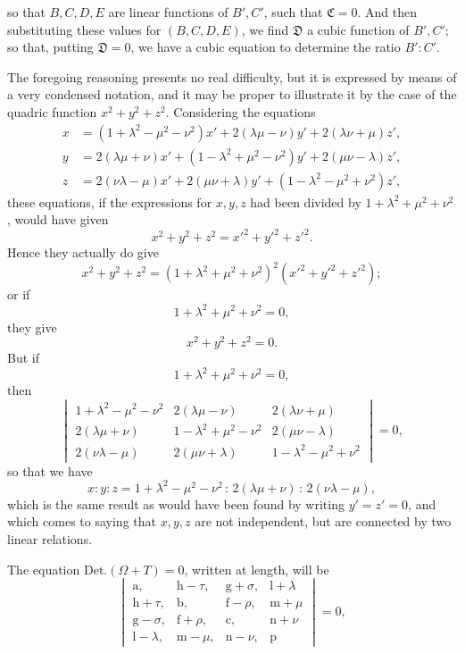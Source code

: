 \documentclass[11pt]{article}
\begin{document}
so that $B,C,D,E$ are linear functions of $B',C'$, such that $\mathfrak{C}=0$. And then
substituting these values for $(B,C,D,E)$, we find $\mathfrak{D}$ a cubic function of $B',C'$;
so that, putting $\mathfrak{D}=0$, we have a cubic equation to determine the ratio $B':C'$.

The foregoing reasoning presents no real difficulty, but it is expressed by means
of a very condensed notation, and it may be proper to illustrate it by the case of
the quadric function $x^{2}+y^{2}+z^{2}$. Considering the equations
\begin{align*}
x &= (1+\lambda^{2}-\mu^{2}-\nu^{2})x' + 2(\lambda\mu-\nu)y' + 2(\lambda\nu+\mu)z', \\
y &= 2(\lambda\mu+\nu)x' + (1-\lambda^{2}+\mu^{2}-\nu^{2})y' + 2(\mu\nu-\lambda)z', \\
z &= 2(\nu\lambda-\mu)x' + 2(\mu\nu+\lambda)y' + (1-\lambda^{2}-\mu^{2}+\nu^{2})z',
\end{align*}
these equations, if the expressions for $x,y,z$ had been divided by $1+\lambda^{2}+\mu^{2}+\nu^{2}$, would
have given
\[ x^{2}+y^{2}+z^{2}=x'^{2}+y'^{2}+z'^{2}. \]
Hence they actually do give
\[ x^{2}+y^{2}+z^{2}=(1+\lambda^{2}+\mu^{2}+\nu^{2})^{2}(x'^{2}+y'^{2}+z'^{2}); \]
or if
\[ 1+\lambda^{2}+\mu^{2}+\nu^{2}=0, \]
they give
\[ x^{2}+y^{2}+z^{2}=0. \]
But if
\[ 1+\lambda^{2}+\mu^{2}+\nu^{2}=0, \]
then
\[
\begin{vmatrix}
1+\lambda^{2}-\mu^{2}-\nu^{2} & 2(\lambda\mu-\nu) & 2(\lambda\nu+\mu)\\
2(\lambda\mu+\nu) & 1-\lambda^{2}+\mu^{2}-\nu^{2} & 2(\mu\nu-\lambda)\\
2(\nu\lambda-\mu) & 2(\mu\nu+\lambda) & 1-\lambda^{2}-\mu^{2}+\nu^{2}
\end{vmatrix}=0,
\]
so that we have
\[ x:y:z=1+\lambda^{2}-\mu^{2}-\nu^{2}\,:\,2(\lambda\mu+\nu)\,:\,2(\nu\lambda-\mu), \]
which is the same result as would have been found by writing $y'=z'=0$, and which
comes to saying that $x,y,z$ are not independent, but are connected by two linear
relations.

The equation $\mathrm{Det.}(\Omega+T)=0$, written at length, will be
\[
\begin{vmatrix}
\mathrm{a}, & \mathrm{h}-\tau, & \mathrm{g}+\sigma, & \mathrm{l}+\lambda \\
\mathrm{h}+\tau, & \mathrm{b}, & \mathrm{f}-\rho, & \mathrm{m}+\mu \\
\mathrm{g}-\sigma, & \mathrm{f}+\rho, & \mathrm{c}, & \mathrm{n}+\nu \\
\mathrm{l}-\lambda, & \mathrm{m}-\mu, & \mathrm{n}-\nu, & \mathrm{p}
\end{vmatrix}=0,
\]
\end{document}
